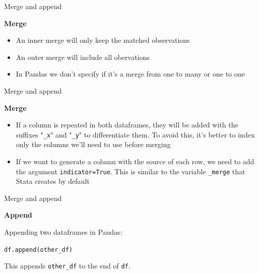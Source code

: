 \documentclass[aspectratio=169]{beamer}
\begin{document}
\begin{frame}{Merge and append}

	\textbf{Merge}

	\begin{itemize}
		\item An inner merge will only keep the matched observations
		\item An outer merge will include all obervations
		\item In Pandas we don't specify if it's a merge from one to many or one to one
	\end{itemize}

\end{frame}

\begin{frame}{Merge and append}

	\textbf{Merge}

	\begin{itemize}
		\item If a column is repeated in both dataframes, they will be added with the suffixes "\texttt{\_x}" and "\texttt{\_y}" to differentiate them. To avoid this, it's better to index only the columns we'll need to use before merging
		\item If we want to generate a column with the source of each row, we need to add the argument \texttt{indicator=True}. This is similar to the variable \texttt{\_merge} that Stata creates by default
	\end{itemize}

\end{frame}

\begin{frame}{Merge and append}

	\textbf{Append}

	Appending two dataframes in Pandas:

	\hspace{7mm} \texttt{df.append(other\_df)}

	This appends \texttt{other\_df} to the end of \texttt{df}.

\end{frame}
\end{document}
